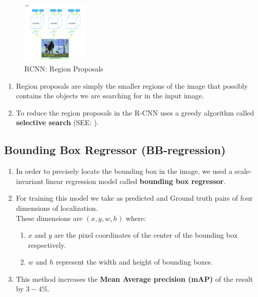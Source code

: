 \begin{table}[H]
    \begin{minipage}[t]{0.49\linewidth}
        \begin{figure}[H]
            \centering
            \includegraphics[width=\linewidth, height=3cm, keepaspectratio]{Pictures/convolutional-neural-network/rcnn-region-proposals.jpg}
            \caption*{RCNN: Region Proposals}
        \end{figure}        
    \end{minipage}
    \hfill
    \begin{minipage}[t]{0.49\linewidth}
        \begin{enumerate}
            \item Region proposals are simply the smaller regions of the image that possibly contains the objects we are searching for in the input image.
        
            \item To reduce the region proposals in the R-CNN uses a greedy algorithm called \textbf{selective search} (SEE: ).
        \end{enumerate}
    \end{minipage}
\end{table}


\subsection{Bounding Box Regressor (BB-regression) \cite{https://www.geeksforgeeks.org/r-cnn-region-based-cnns/}}\label{Bounding Box Regressor (BB-regression)}

\begin{enumerate}
    \item In order to precisely locate the bounding box in the image, we used a scale-invariant linear regression model called \textbf{bounding box regressor}.

    \item For training this model we take as predicted and Ground truth pairs of four dimensions of localization.\\
    These dimensions are $(x, y, w, h)$ where:
    \begin{enumerate}
        \item $x$ and $y$ are the pixel coordinates of the center of the bounding box respectively. 

        \item $w$ and $h$ represent the width and height of bounding boxes.
    \end{enumerate}
    
    \item This method increases the \textbf{Mean Average precision (mAP)} of the result by $3-4\%$.
    
\end{enumerate}



